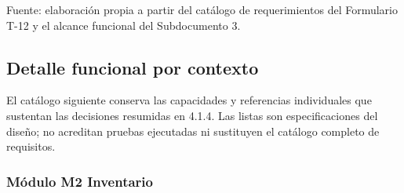 {\fontsize{9pt}{11pt}\selectfont\raggedright Fuente: elaboración propia a partir del catálogo de requerimientos del Formulario T-12 y el alcance funcional del Subdocumento 3.\par}

\subsection*{Detalle funcional por contexto}
\label{anxD:detalle-contextos}
El catálogo siguiente conserva las capacidades y referencias individuales que sustentan las decisiones resumidas en 4.1.4. Las listas son especificaciones del diseño; no acreditan pruebas ejecutadas ni sustituyen el catálogo completo de requisitos.

\subsubsection*{Módulo M2 Inventario}
